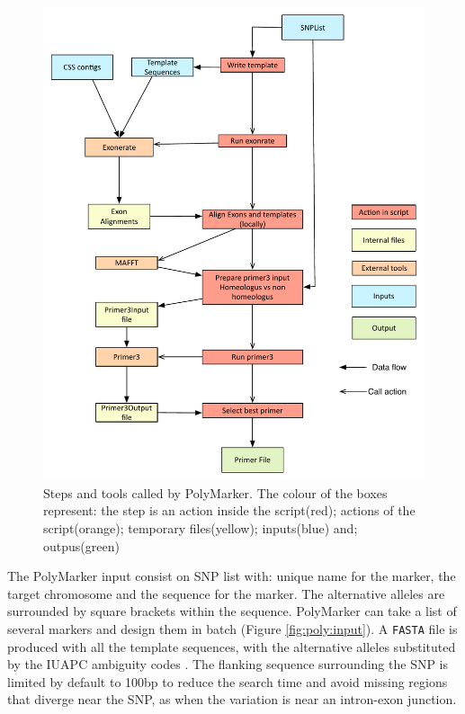 \begin{figure}
\includegraphics[width=1\textwidth]{PolyMarker/Figures/pipeline.pdf}
        \caption{Steps and tools called by PolyMarker. The colour of the boxes represent: the step is an action inside the script(red); actions of the script(orange); temporary files(yellow); inputs(blue) and; outpus(green)}
        \label{fig:poly:pipeline}
\end{figure}

The PolyMarker input consist on SNP list with: unique name for the marker, the target chromosome and the sequence for the marker. 
The alternative alleles are surrounded by square brackets within the sequence. PolyMarker can take a list of several markers and design them in batch (Figure \ref{fig:poly:input}). 
A \texttt{FASTA} file is produced with all the template sequences, with the alternative alleles substituted by the IUAPC ambiguity codes \citep{Cornish-Bowden1985}. 
The flanking sequence surrounding the SNP is limited by default to 100bp to reduce the search time and avoid missing regions that diverge near the SNP, as when the variation is near an intron-exon junction. 

